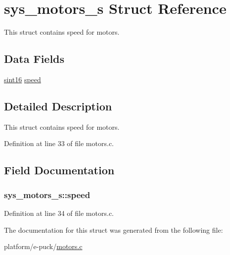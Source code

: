 \hypertarget{structsys__motors__s}{}\section{sys\+\_\+motors\+\_\+s Struct Reference}
\label{structsys__motors__s}


This struct contains speed for motors.  


\subsection*{Data Fields}
\begin{DoxyCompactItemize}
\item 
\hyperlink{definitions_8h_a74df79fde3c518e55b29ce6360a9c76e}{sint16} \hyperlink{structsys__motors__s_af052a7c6ad50ff8e0acaa8293b37f659}{speed}
\end{DoxyCompactItemize}


\subsection{Detailed Description}
This struct contains speed for motors. 

Definition at line 33 of file motors.\+c.



\subsection{Field Documentation}
\hypertarget{structsys__motors__s_af052a7c6ad50ff8e0acaa8293b37f659}{}
\subsubsection[{speed}]{ sys\+\_\+motors\+\_\+s\+::speed}\label{structsys__motors__s_af052a7c6ad50ff8e0acaa8293b37f659}


Definition at line 34 of file motors.\+c.



The documentation for this struct was generated from the following file\+:\begin{DoxyCompactItemize}
\item 
platform/e-\/puck/\hyperlink{motors_8c}{motors.\+c}\end{DoxyCompactItemize}
